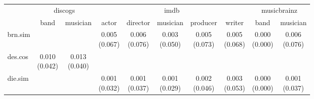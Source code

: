 \documentclass[epsfig,a4paper,11pt,titlepage,twoside,openany]{book}
\begin{document}



\begin{table}[h]
\centering
\begin{tabular}{l|c|c|c|c|c|c|c|c|c|}
\cline{2-10}
                                                           & \multicolumn{2}{c|}{discogs} & \multicolumn{5}{c|}{imdb}                                                & \multicolumn{2}{c|}{musicbrainz} \\ \cline{2-10} 
                                                           & band          & musician     & actor        & director     & musician     & producer     & writer       & band            & musician       \\ \hline
\multicolumn{1}{|l|}{brn.sim}                        &               &              & \makecell{0.005 \\ (0.067)} & \makecell{0.006 \\ (0.076)} & \makecell{0.003 \\ (0.050)} & \makecell{0.005 \\ (0.073)} & \makecell{0.005 \\ (0.068)} & \makecell{0.000 \\ (0.000)}    & \makecell{0.006 \\ (0.076)}   \\ \hline
\multicolumn{1}{|l|}{des.cos}                  & \makecell{0.010 \\ (0.042)}  & \makecell{0.013 \\ (0.040)} &              &              &              &              &              &                 &                \\ \hline
\multicolumn{1}{|l|}{die.sim}                        &               &              & \makecell{0.001 \\ (0.032)} & \makecell{0.001 \\ (0.037)} & \makecell{0.001 \\ (0.029)} & \makecell{0.002 \\ (0.046)} & \makecell{0.003 \\ (0.053)} & \makecell{0.000 \\ (0.000)}    & \makecell{0.001 \\ (0.037)}   \\ \hline

\end{tabular}
\end{table}
\end{document}
